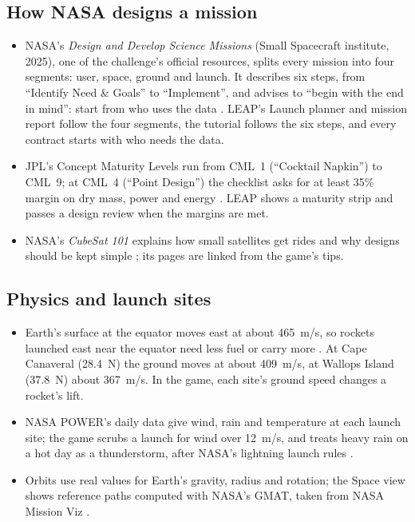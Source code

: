 \documentclass[11pt,a4paper]{article}
\begin{document}
\subsection{How NASA designs a mission}
\begin{itemize}
  \item NASA's \emph{Design and Develop Science Missions} (Small Spacecraft institute, 2025), one of the challenge's
        official resources, splits every mission into four segments: user, space, ground and launch. It describes six
        steps, from ``Identify Need \& Goals'' to ``Implement'', and advises to ``begin with the end in mind'': start
        from who uses the data \cite{segments}. LEAP's Launch planner and mission report follow the four segments, the
        tutorial follows the six steps, and every contract starts with who needs the data.
  \item JPL's Concept Maturity Levels run from CML~1 (``Cocktail Napkin'') to CML~9; at CML~4 (``Point Design'') the
        checklist asks for at least 35\% margin on dry mass, power and energy \cite{cml}. LEAP shows a maturity strip
        and passes a design review when the margins are met.
  \item NASA's \emph{CubeSat 101} explains how small satellites get rides and why designs should be kept simple
        \cite{cubesat101}; its pages are linked from the game's tips.
\end{itemize}

\subsection{Physics and launch sites}
\begin{itemize}
  \item Earth's surface at the equator moves east at about 465~m/s, so rockets launched east near the equator need
        less fuel or carry more \cite{spaceport}. At Cape Canaveral (28.4\textdegree{}~N) the ground moves at about
        409~m/s, at Wallops Island (37.8\textdegree{}~N) about 367~m/s. In the game, each site's ground speed changes
        a rocket's lift.
  \item NASA POWER's daily data give wind, rain and temperature at each launch site; the game scrubs a launch for
        wind over 12~m/s, and treats heavy rain on a hot day as a thunderstorm, after NASA's lightning launch rules
        \cite{power}.
  \item Orbits use real values for Earth's gravity, radius and rotation; the Space view shows reference paths computed
        with NASA's GMAT, taken from NASA Mission Viz \cite{missionviz, gmat}.
\end{itemize}
\end{document}
